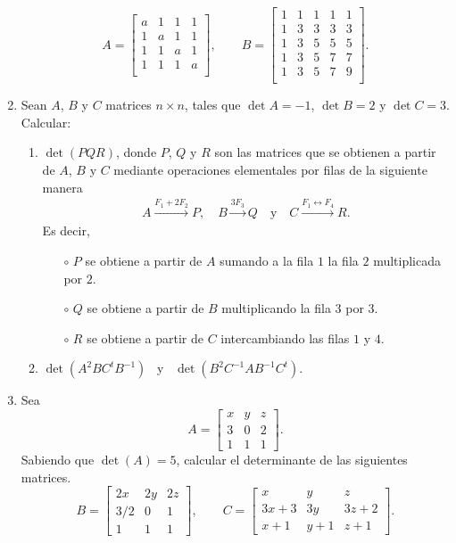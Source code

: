 \begin{enumerate}[topsep=6pt,itemsep=.4cm]
        $$A =
        \begin{bmatrix}
            a&1&1&1 \\
            1&a&1&1 \\
            1&1&a&1 \\
            1&1&1&a \\
        \end{bmatrix}, \qquad    
        B =
        \begin{bmatrix}
            1&1&1&1&1 \\
            1&3&3&3&3 \\
            1&3&5&5&5 \\
            1&3&5&7&7 \\
            1&3&5&7&9 \\
        \end{bmatrix}.
        $$

\item Sean $A$, $B$ y $C$ matrices $n\times n$, tales que $\det A=-1$, $\det B=2$ y $\det C=3$.
Calcular:

\begin{enumerate}
\item $\det(PQR)$, donde $P$, $Q$ y $R$ son las matrices que se obtienen a partir de $A$, $B$ y $C$ mediante operaciones elementales por filas de la siguiente manera
 \begin{align*}
 A\overset{F_1+2F_2}{\longrightarrow} P,\quad
 B\overset{3F_3}{\longrightarrow} Q
 \quad\mbox{y}\quad
 C\overset{F_1\leftrightarrow F_4}{\longrightarrow} R.
 \end{align*}
 Es decir,
 \begin{itemize}
  \item[$\circ$] $P$ se obtiene a partir de $A$ sumando a la fila $1$ la fila $2$ multiplicada por $2$.
  \item[$\circ$] $Q$ se obtiene a partir de $B$ multiplicando la fila $3$ por $3$.
  \item[$\circ$] $R$ se obtiene a partir de $C$ intercambiando las filas $1$ y $4$.
 \end{itemize}
    \item $\det(A^2BC^tB^{-1})$ \ y \ $\det(B^2C^{-1}AB^{-1}C^{t})$.
\end{enumerate}


\item  Sea
$$A=
\begin{bmatrix}
    x&y&z \\
    3&0&2\\
    1&1&1
\end{bmatrix}.$$
Sabiendo que $\det(A) = 5$, calcular el determinante de las siguientes matrices.
$$
B = \begin{bmatrix}
2x&2y&2z \\
3/2&0&1\\
1&1&1
\end{bmatrix}, \qquad
C=
\begin{bmatrix}
    x&y&z \\
    3x+3&3y&3z+2\\
    x+1&y+1&z+1
\end{bmatrix}.
$$



\end{enumerate}
